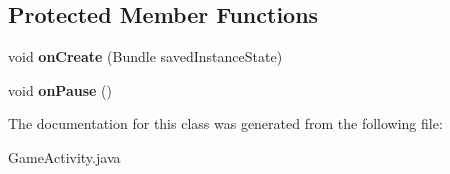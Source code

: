 \subsection*{Protected Member Functions}
\begin{DoxyCompactItemize}
\item 
void {\bfseries on\+Create} (Bundle saved\+Instance\+State)\hypertarget{classcom_1_1initi_1_1thierry_1_1colormatchapp__v02_1_1_game_activity_a8e612beece821db2ee7a139252e40bad}{}\label{classcom_1_1initi_1_1thierry_1_1colormatchapp__v02_1_1_game_activity_a8e612beece821db2ee7a139252e40bad}

\item 
void {\bfseries on\+Pause} ()\hypertarget{classcom_1_1initi_1_1thierry_1_1colormatchapp__v02_1_1_game_activity_afa0bea38dc5c22ceecaf2ba56b73ee16}{}\label{classcom_1_1initi_1_1thierry_1_1colormatchapp__v02_1_1_game_activity_afa0bea38dc5c22ceecaf2ba56b73ee16}

\end{DoxyCompactItemize}


The documentation for this class was generated from the following file\+:\begin{DoxyCompactItemize}
\item 
Game\+Activity.\+java\end{DoxyCompactItemize}

